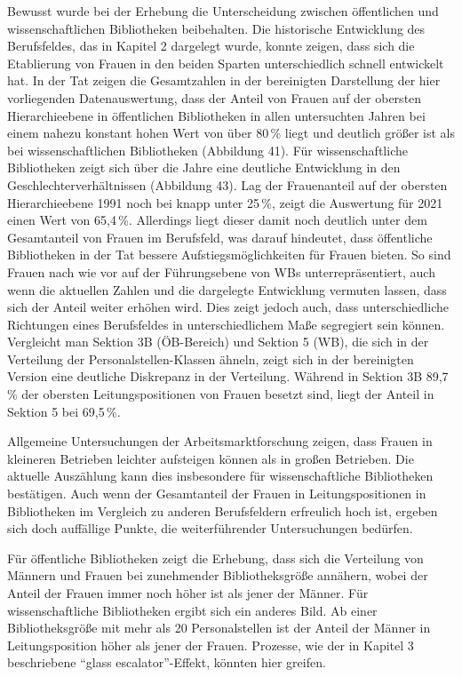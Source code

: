\documentclass[a4paper,
fontsize=11pt,
oneside,
numbers=noperiodatend,
parskip=half-,
bibliography=totoc,
final
]{scrartcl}
\begin{document}
Bewusst wurde bei der Erhebung die Unterscheidung zwischen öffentlichen
und wissenschaftlichen Bibliotheken beibehalten. Die historische
Entwicklung des Berufsfeldes, das in Kapitel 2 dargelegt wurde, konnte
zeigen, dass sich die Etablierung von Frauen in den beiden Sparten
unterschiedlich schnell entwickelt hat. In der Tat zeigen die
Gesamtzahlen in der bereinigten Darstellung der hier vorliegenden
Datenauswertung, dass der Anteil von Frauen auf der obersten
Hierarchieebene in öffentlichen Bibliotheken in allen untersuchten
Jahren bei einem nahezu konstant hohen Wert von über 80\,\% liegt und
deutlich größer ist als bei wissenschaftlichen Bibliotheken (Abbildung
41). Für wissenschaftliche Bibliotheken zeigt sich über die Jahre eine
deutliche Entwicklung in den Geschlechterverhältnissen (Abbildung 43).
Lag der Frauenanteil auf der obersten Hierarchieebene 1991 noch bei
knapp unter 25\,\%, zeigt die Auswertung für 2021 einen Wert von 65,4\,\%.
Allerdings liegt dieser damit noch deutlich unter dem Gesamtanteil von
Frauen im Berufsfeld, was darauf hindeutet, dass öffentliche
Bibliotheken in der Tat bessere Aufstiegsmöglichkeiten für Frauen
bieten. So sind Frauen nach wie vor auf der Führungsebene von WBs
unterrepräsentiert, auch wenn die aktuellen Zahlen und die dargelegte
Entwicklung vermuten lassen, dass sich der Anteil weiter erhöhen wird.
Dies zeigt jedoch auch, dass unterschiedliche Richtungen eines
Berufsfeldes in unterschiedlichem Maße segregiert sein können.
Vergleicht man Sektion 3B (ÖB-Bereich) und Sektion 5 (WB), die sich in
der Verteilung der Personalstellen-Klassen ähneln, zeigt sich in der
bereinigten Version eine deutliche Diskrepanz in der Verteilung. Während
in Sektion 3B 89,7\,\% der obersten Leitungspositionen von Frauen besetzt
sind, liegt der Anteil in Sektion 5 bei 69,5\,\%.

Allgemeine Untersuchungen der Arbeitsmarktforschung zeigen, dass Frauen
in kleineren Betrieben leichter aufsteigen können als in großen
Betrieben. Die aktuelle Auszählung kann dies insbesondere für
wissenschaftliche Bibliotheken bestätigen. Auch wenn der Gesamtanteil
der Frauen in Leitungspositionen in Bibliotheken im Vergleich zu anderen
Berufsfeldern erfreulich hoch ist, ergeben sich doch auffällige Punkte,
die weiterführender Untersuchungen bedürfen.

Für öffentliche Bibliotheken zeigt die Erhebung, dass sich die
Verteilung von Männern und Frauen bei zunehmender Bibliotheksgröße
annähern, wobei der Anteil der Frauen immer noch höher ist als jener der
Männer. Für wissenschaftliche Bibliotheken ergibt sich ein anderes Bild.
Ab einer Bibliotheksgröße mit mehr als 20 Personalstellen ist der Anteil der Männer 
in Leitungsposition höher als jener der Frauen. Prozesse, wie der in
Kapitel 3 beschriebene \enquote{glass escalator}-Effekt, könnten hier
greifen.
\end{document}
